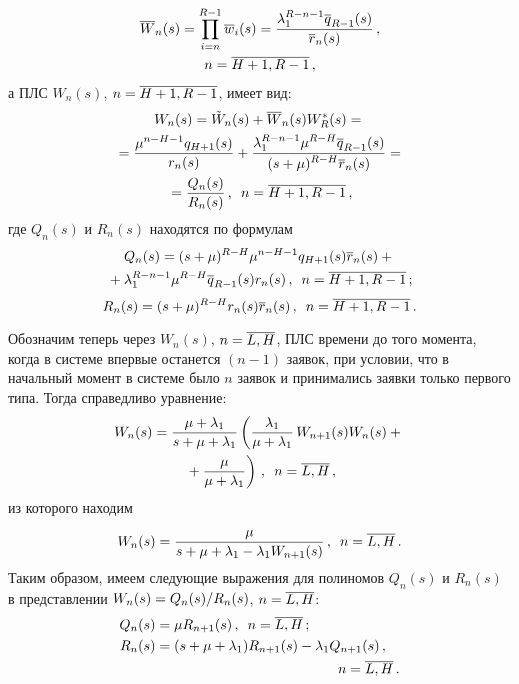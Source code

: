 \begin{multicols}{2}
\noindent
\begin{multline*}
\overline{W}_{n}(s) = \prod\limits_{i=n}^{R-1} \overline{w}_{i}(s) =
\displaystyle\frac{\displaystyle \lambda_1^{R-n-1} \overline{q}_{R-1}(s) \mathstrut}{\displaystyle \overline{r}_{n}(s)\mathstrut} \,,
\\ n=\overline{H+1,R-1}\,,
\end{multline*}
а ПЛС $W_{n}(s)$, $n\hm=\overline{H+1,R-1}$,
имеет вид:
\begin{multline*}
W_{n}(s) = \tilde{W}_{n}(s) + \overline{W}_{n}(s) W^*_R(s)
={}\\
{}=
\displaystyle\frac{\displaystyle \mu^{n-H-1} q_{H+1}(s)\mathstrut}{\displaystyle r_{n}(s)\mathstrut}
+
\displaystyle\frac{\displaystyle \lambda_1^{R-n-1} \mu^{R-H} \overline{q}_{R-1}(s)
\mathstrut}{\displaystyle (s + \mu)^{R-H} \overline{r}_{n}(s)\mathstrut} ={}\\
{}=
\displaystyle\frac{\displaystyle Q_n(s) \mathstrut}{\displaystyle R_n(s)\mathstrut}\,,\enskip n=\overline{H+1,R-1}\,,
\end{multline*}
где $Q_n(s)$ и $R_n(s)$ находятся по формулам
\begin{multline*}
Q_{n}(s)= (s + \mu)^{R-H} \mu^{n-H-1} q_{H+1}(s) \overline{r}_{n}(s)
+{}\\
{}+ \lambda_1^{R-n-1} \mu^{R-H} \overline{q}_{R-1}(s) r_{n}(s) \,,\enskip
n=\overline{H+1,R-1}\,;
\end{multline*}
\begin{equation*}
R_{n}(s) = (s + \mu)^{R-H} r_{n}(s) \overline{r}_{n}(s) \,,\enskip
 n=\overline{H+1,R-1}\,.
\end{equation*}

Обозначим теперь через $W_n(s)$, $n\hm=\overline{L,H}$, ПЛС времени
до того момента, когда в системе впервые останется $(n-1)$ заявок,
при условии, что в начальный момент в системе было $n$ заявок и
принимались заявки только первого типа. Тогда справедливо уравнение:
\begin{multline*}
W_{n}(s) = \displaystyle\frac{\displaystyle \mu+\lambda_1 \mathstrut}{\displaystyle s + \mu+\lambda_1\mathstrut}
\left(
\displaystyle\frac{\displaystyle \lambda_1\mathstrut}{\displaystyle \mu+\lambda_1\mathstrut}\, W_{n+1}(s) W_n(s)
+ {}\right.\\
\left.{}+\displaystyle\frac{\displaystyle \mu\mathstrut}{\displaystyle \mu+\lambda_1\mathstrut} \right)\,,\enskip n=\overline{L,H}\,,
\end{multline*}
из которого находим
\begin{equation*}
W_{n}(s) = \displaystyle\frac{\displaystyle \mu \mathstrut}{\displaystyle s + \mu + \lambda_1 - \lambda_1 W_{n+1}(s)\mathstrut}
\,,\enskip n=\overline{L,H}\,.
\end{equation*}
Таким образом, имеем следующие выражения для
полиномов $Q_n(s)$ и $R_n(s)$ в представлении
$W_n(s)\hm=Q_n(s)/R_n(s)$, $n\hm=\overline{L,H}$:
\begin{align*}
Q_{n}(s) &= \mu R_{n+1}(s) \,,\enskip n=\overline{L,H}\,;\\
R_{n}(s) &= (s + \mu + \lambda_1) R_{n+1}(s) - \lambda_1 Q_{n+1}(s)
\,,\\
&\hspace*{46mm}n=\overline{L,H}\,.
\end{align*}


\end{multicols}
